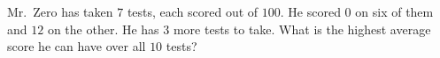 Mr.\ Zero has taken $7$ tests, each scored out of $100$. He scored $0$ on six of them and $12$ on the other. He has $3$ more tests to take. What is the highest average score he can have over all $10$ tests?
